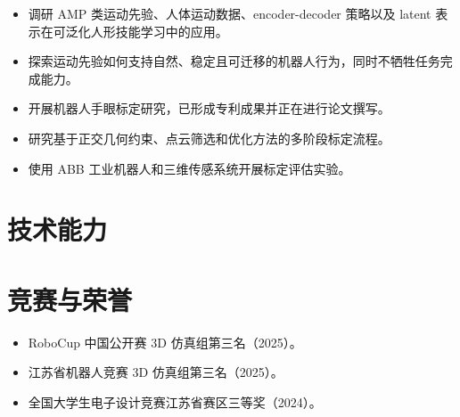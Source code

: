 \documentclass[10pt]{article}
\begin{document}
\begin{itemize}
  \item 调研 AMP 类运动先验、人体运动数据、encoder-decoder 策略以及 latent 表示在可泛化人形技能学习中的应用。
  \item 探索运动先验如何支持自然、稳定且可迁移的机器人行为，同时不牺牲任务完成能力。
\end{itemize}

\begin{itemize}
  \item 开展机器人手眼标定研究，已形成专利成果并正在进行论文撰写。
  \item 研究基于正交几何约束、点云筛选和优化方法的多阶段标定流程。
  \item 使用 ABB 工业机器人和三维传感系统开展标定评估实验。
\end{itemize}

\section{技术能力}\color{black}

\section{竞赛与荣誉}\color{black}
\begin{itemize}
  \item RoboCup 中国公开赛 3D 仿真组第三名（2025）。
  \item 江苏省机器人竞赛 3D 仿真组第三名（2025）。
  \item 全国大学生电子设计竞赛江苏省赛区三等奖（2024）。
\end{itemize}
\end{document}
